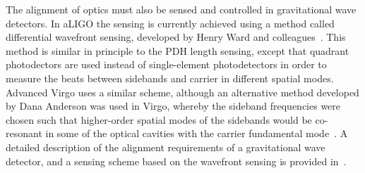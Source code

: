 The alignment of optics must also be sensed and controlled in gravitational wave detectors.
In aLIGO the sensing is currently achieved using a method called differential wavefront sensing, developed by Henry Ward and colleagues~\cite{Morrison1994, Morrison1994b}. 
This method is similar in principle to the PDH length sensing, except that quadrant photodectors are used instead of single-element photodetectors in order to measure the beats between sidebands and carrier in different spatial modes.
Advanced Virgo uses a similar scheme, although an alternative method developed by Dana Anderson was used in Virgo, whereby the sideband frequencies were chosen such that higher-order spatial modes of the sidebands would be co-resonant in some of the optical cavities with the carrier fundamental mode~\cite{Anderson1984}.
A detailed description of the alignment requirements of a gravitational wave detector, and a sensing scheme based on the wavefront sensing is provided in~\cite{Fritschel1998}.